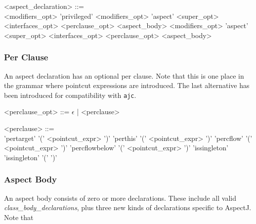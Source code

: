 \begin{minipage}{6in}
\begin{grammar}
\begin{blue}
<aspect_declaration> ::= \hspace{1in} \\
        {\red <modifiers_opt>} 'privileged' {\red <modifiers_opt>} 'aspect' {} 
          {\red <super_opt> <interfaces_opt>} <perclause_opt> <aspect_body>
\alt
        {\red <modifiers_opt>} 'aspect' {}
        {\red<super_opt> <interfaces_opt>} <perclause_opt> <aspect_body>
\end{blue}
\end{grammar}
\end{minipage}

\subsubsection{Per Clause}

An aspect declaration has an optional per clause.  Note that this is
one place in the grammar where pointcut expressions are introduced.
The last alternative has been introduced for compatibility with
{\tt ajc}.

\begin{minipage}{6in}
\begin{blue}
\begin{grammar}
<perclause_opt> ::= $\epsilon$ |  <perclause> 

<perclause> ::= \hspace{1in} \\ 
                'pertarget' '(' {\blue <pointcut_expr>} ')'
         \alt   'perthis' '(' {\blue <pointcut_expr>} ')'
         \alt   'percflow' '(' {\blue <pointcut_expr>} ')'
         \alt   'percflowbelow' '(' {\blue <pointcut_expr>} ')'
         \alt   'issingleton'  
         \alt   'issingleton' '(' ')'
\end{grammar}
\end{blue}
\end{minipage}

\subsubsection{Aspect Body}

An aspect body consists of zero or more declarations.   These include
all valid {\em class\_body\_declarations},  plus three new kinds of
declarations specific to AspectJ.   Note that 

